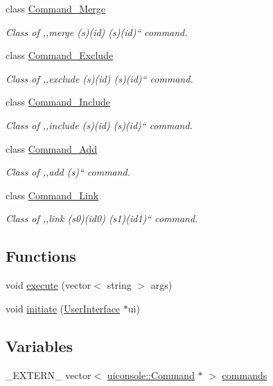 \begin{DoxyCompactItemize}
class \hyperlink{classuiconsole_1_1Command__Merge}{Command\_\-Merge}
\begin{DoxyCompactList}\small\item\em Class of ,,merge (s)(id) (s)(id)`` command. \item\end{DoxyCompactList}\item 
class \hyperlink{classuiconsole_1_1Command__Exclude}{Command\_\-Exclude}
\begin{DoxyCompactList}\small\item\em Class of ,,exclude (s)(id) (s)(id)`` command. \item\end{DoxyCompactList}\item 
class \hyperlink{classuiconsole_1_1Command__Include}{Command\_\-Include}
\begin{DoxyCompactList}\small\item\em Class of ,,include (s)(id) (s)(id)`` command. \item\end{DoxyCompactList}\item 
class \hyperlink{classuiconsole_1_1Command__Add}{Command\_\-Add}
\begin{DoxyCompactList}\small\item\em Class of ,,add (s)`` command. \item\end{DoxyCompactList}\item 
class \hyperlink{classuiconsole_1_1Command__Link}{Command\_\-Link}
\begin{DoxyCompactList}\small\item\em Class of ,,link (s0)(id0) (s1)(id1)`` command. \item\end{DoxyCompactList}\end{DoxyCompactItemize}
\subsection*{Functions}
\begin{DoxyCompactItemize}
\item 
void \hyperlink{namespaceuiconsole_a40263e63a42257769b2fb9a95fd771c1}{execute} (vector$<$ string $>$ args)
\item 
void \hyperlink{namespaceuiconsole_a037fc32900a055adc36892666b385f30}{initiate} (\hyperlink{classUserInterface}{UserInterface} $\ast$ui)
\end{DoxyCompactItemize}
\subsection*{Variables}
\begin{DoxyCompactItemize}
\item 
\_\-EXTERN\_\- vector$<$ \hyperlink{classuiconsole_1_1Command}{uiconsole::Command} $\ast$ $>$ \hyperlink{namespaceuiconsole_a2592267a0e2c7bd8742a231b656153d2}{commands}
\end{DoxyCompactItemize}


